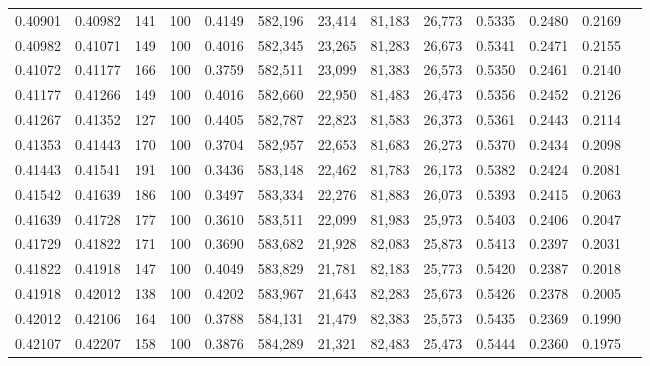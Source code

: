 \begin{tabular}{rrrrrrrrrrrrr}
0.40901 & 0.40982 &   141 & 100 &                                     0.4149 & 582,196 &  23,414 &  81,183 &  26,773 & 0.5335 & 0.2480 & 0.2169 \\
0.40982 & 0.41071 &   149 & 100 &                                     0.4016 & 582,345 &  23,265 &  81,283 &  26,673 & 0.5341 & 0.2471 & 0.2155 \\
0.41072 & 0.41177 &   166 & 100 &                                     0.3759 & 582,511 &  23,099 &  81,383 &  26,573 & 0.5350 & 0.2461 & 0.2140 \\
0.41177 & 0.41266 &   149 & 100 &                                     0.4016 & 582,660 &  22,950 &  81,483 &  26,473 & 0.5356 & 0.2452 & 0.2126 \\
0.41267 & 0.41352 &   127 & 100 &                                     0.4405 & 582,787 &  22,823 &  81,583 &  26,373 & 0.5361 & 0.2443 & 0.2114 \\
0.41353 & 0.41443 &   170 & 100 &                                     0.3704 & 582,957 &  22,653 &  81,683 &  26,273 & 0.5370 & 0.2434 & 0.2098 \\
0.41443 & 0.41541 &   191 & 100 &                                     0.3436 & 583,148 &  22,462 &  81,783 &  26,173 & 0.5382 & 0.2424 & 0.2081 \\
0.41542 & 0.41639 &   186 & 100 &                                     0.3497 & 583,334 &  22,276 &  81,883 &  26,073 & 0.5393 & 0.2415 & 0.2063 \\
0.41639 & 0.41728 &   177 & 100 &                                     0.3610 & 583,511 &  22,099 &  81,983 &  25,973 & 0.5403 & 0.2406 & 0.2047 \\
0.41729 & 0.41822 &   171 & 100 &                                     0.3690 & 583,682 &  21,928 &  82,083 &  25,873 & 0.5413 & 0.2397 & 0.2031 \\
0.41822 & 0.41918 &   147 & 100 &                                     0.4049 & 583,829 &  21,781 &  82,183 &  25,773 & 0.5420 & 0.2387 & 0.2018 \\
0.41918 & 0.42012 &   138 & 100 &                                     0.4202 & 583,967 &  21,643 &  82,283 &  25,673 & 0.5426 & 0.2378 & 0.2005 \\
0.42012 & 0.42106 &   164 & 100 &                                     0.3788 & 584,131 &  21,479 &  82,383 &  25,573 & 0.5435 & 0.2369 & 0.1990 \\
0.42107 & 0.42207 &   158 & 100 &                                     0.3876 & 584,289 &  21,321 &  82,483 &  25,473 & 0.5444 & 0.2360 & 0.1975 \\

\end{tabular}

